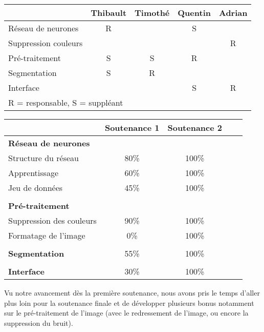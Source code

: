 \begin{center}
    \begin{tabular}{@{} l *4c @{}}
        \toprule
        \multicolumn{1}{c}{} &
            \textbf{Thibault} & \textbf{Timothé}  &
            \textbf{Quentin} & \textbf{Adrian} \\
        \midrule
        Réseau de neurones & R & & S & \\
        Suppression couleurs & & & & R \\
        Pré-traitement & S & S & R & \\
        Segmentation & S & R & & \\
        Interface & & & S & R \\
        \bottomrule
        \multicolumn{4}{l}{\footnotesize R = responsable, S = suppléant}\\
    \end{tabular}
\end{center}

\begin{center}
    \begin{tabular}{@{} l *4c @{}}
        \toprule
        \multicolumn{1}{c}{} & \textbf{Soutenance 1}  & \textbf{Soutenance 2} \\
        \midrule
        \textbf{Réseau de neurones} \\
        Structure du réseau & 80\% & 100\% \\
        Apprentissage & 60\% & 100\% \\
        Jeu de données & 45\% & 100\% \\\\
        \textbf{Pré-traitement} \\
        Suppression des couleurs & 90\% & 100\% \\
        Formatage de l'image & 0\% & 100\% \\\\
        \textbf{Segmentation} & 55\% & 100\% \\\\
        \textbf{Interface} & 30\% & 100\% \\
        \bottomrule
    \end{tabular}
\end{center}

\vspace{2em}

Vu notre avancement dès la première soutenance, nous avons pris le temps d'aller
plus loin pour la soutenance finale et de développer plusieurs bonus notamment
sur le pré-traitement de l'image (avec le redressement de l'image, ou encore la
suppression du bruit).
